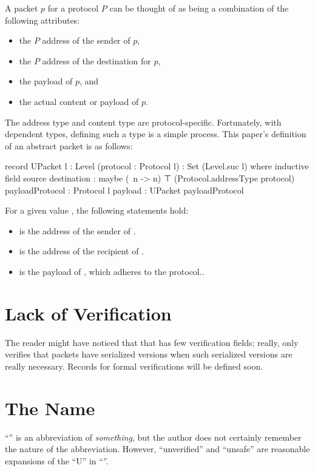 \documentclass{report}
\begin{document}
\begin{itemize}
A packet \(p\) for a protocol \(P\) can be thought of as being a combination of the following attributes:
\begin{itemize}
	\item the \(P\) address of the sender of \(p\),
	\item the \(P\) address of the destination for \(p\),
	\item the payload of \(p\), and
	\item the actual content or payload of \(p\).
\end{itemize}

The address type and content type are protocol-specific.  Fortunately, with dependent types, defining such a type is a simple process.  This paper's definition of an abstract packet is as follows:

\begin{code}
    record UPacket {l : Level} (protocol : Protocol l) : Set (Level.suc l) where
      inductive
      field
        source
         destination : maybe (\ n -> n) ⊤ (Protocol.addressType protocol)
        payloadProtocol : Protocol l
        payload : UPacket payloadProtocol
\end{code}

For a given   value , the following statements hold:
\begin{itemize}
	\item {}  is the address of the sender of .
	\item {}  is the address of the recipient of .
	\item {}  is the payload of , which adheres to the   protocol..
\end{itemize}

\section{Lack of Verification}
The reader might have noticed that that  has few verification fields; really,  only verifies that packets have serialized versions when such serialized versions are really necessary.  Records for formal verifications will be defined soon.

\section{The Name}
``'' is an abbreviation of \emph{something}, but the author does not certainly remember the nature of the abbreviation.  However, ``unverified'' and ``unsafe'' are reasonable expansions of the ``U'' in ``''.


\end{itemize}
\end{document}

